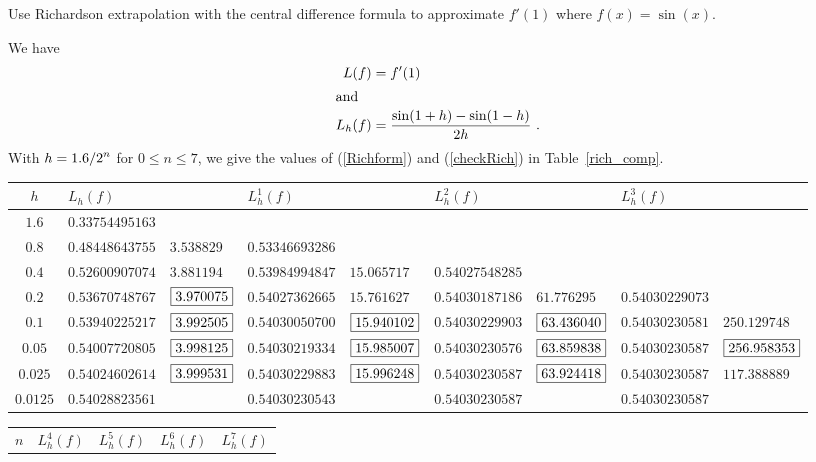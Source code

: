 \begin{egg}
Use Richardson extrapolation with the central difference formula to
approximate $f'(1)$ where $f(x) = \sin(x)$.

We have
\begin{align*}
L(f) &= f'(1) \\
\intertext{and}
L_h(f) &= \frac{\sin(1+h) - \sin(1-h)}{2h} \ .
\end{align*}
With $\displaystyle h=1.6/2^n$ for $0 \leq n \leq 7$, we give the values of
(\ref{Richform}) and (\ref{checkRich}) in Table~\ref{rich_comp}.

\begin{table}
\footnotesize
\begin{sideways}
\begin{tabular}{c|llllllll}
$h$ & \multicolumn{2}{l}{$L_h(f)$} & \multicolumn{2}{l}{$L_h^1(f)$} &
\multicolumn{2}{l}{$L_h^2(f)$} & \multicolumn{2}{l}{$L_h^3(f)$} \\
\hline
$1.6$ & $0.33754495163$ & && && && \\
$0.8$ & $0.48448643755$ & $3.538829$ & $0.53346693286$ & && && \\
$0.4$ & $0.52600907074$ & $3.881194$ & $0.53984994847$ &
$15.065717$ & $0.54027548285$ & && \\
$0.2$ & $0.53670748767$ & $\fbox{3.970075}$ & $0.54027362665$ &
$15.761627$ & $0.54030187186$ & $61.776295$ & $0.54030229073$ & \\
$0.1$ & $0.53940225217$ & $\fbox{3.992505}$ & $0.54030050700$ &
$\fbox{15.940102}$ & $0.54030229903$ & $\fbox{63.436040}$ &
$0.54030230581$ & $250.129748$ \\
$0.05$ & $0.54007720805$ & $\fbox{3.998125}$ & $0.54030219334$ &
$\fbox{15.985007}$ & $0.54030230576$ & $\fbox{63.859838}$ &
$0.54030230587$ & $\fbox{256.958353}$  \\
$0.025$ & $0.54024602614$ & $\fbox{3.999531}$ & $0.54030229883$ &
$\fbox{15.996248}$ & $0.54030230587$ & $\fbox{63.924418}$ &
$0.54030230587$ & $117.388889$ \\
$0.0125$ & $0.54028823561$ & & $0.54030230543$ & & $0.54030230587$ & &
$0.54030230587$ &
\end{tabular}
\end{sideways}
\hspace*{5em}
\begin{sideways}
\begin{tabular}{c|llllllll}
$n$ & \multicolumn{2}{l}{$L_h^4(f)$} & \multicolumn{2}{l}{$L_h^5(f)$} &
\multicolumn{2}{l}{$L_h^6(f)$} & \multicolumn{2}{l}{$L_h^7(f)$} \\

\end{tabular}
\end{sideways}
\end{table}
\end{egg}
